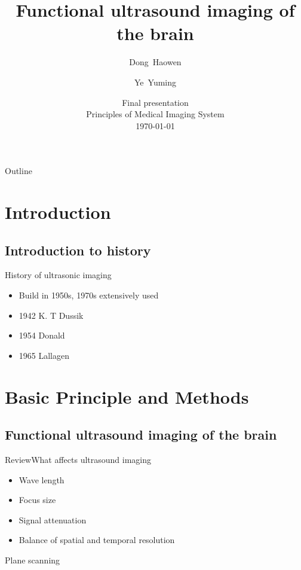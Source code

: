 \documentclass{beamer}
\title{Functional ultrasound imaging of the brain}
\subtitle{}
\author{Dong~Haowen\inst{1} \and Ye~Yuming\inst{2}}
\institute[SUSTech] %
{
 	Department of Biomedical Engineering\\
 Southern University of Science and Technology}
\date{Final presentation\\Principles of Medical Imaging System\\\today}
\begin{document}
	
\begin{frame}
  \titlepage
\end{frame}

\begin{frame}{Outline}
  \tableofcontents
\end{frame}


\section{Introduction}

\subsection{Introduction to history}

\begin{frame}{History of ultrasonic imaging}
  \begin{itemize}
  \item {
    Build in 1950s, 1970s extensively used
  }\vspace{0.3cm}
\pause
  \item {
    1942 K. T Dussik
  }\vspace{0.3cm}
\pause
\item{
1954 Donald
}\vspace{0.3cm}
\pause
\item{
1965 Lallagen
}
  \end{itemize}
\end{frame}







\section{Basic Principle and Methods}



\subsection{Functional ultrasound imaging of the brain}
\begin{frame}{Review}{What affects ultrasound imaging}
\begin{itemize}
	\item{
	Wave length\pause	
}
	\item{
	Focus size\pause	
}
	\item{
	Signal attenuation\pause
}
\item{
	\alert{Balance of spatial and temporal resolution}
}
\end{itemize}
\pause
\centering
\large
\vspace{0.5cm}
	\alert{Plane scanning}
\end{frame}
\end{document}
